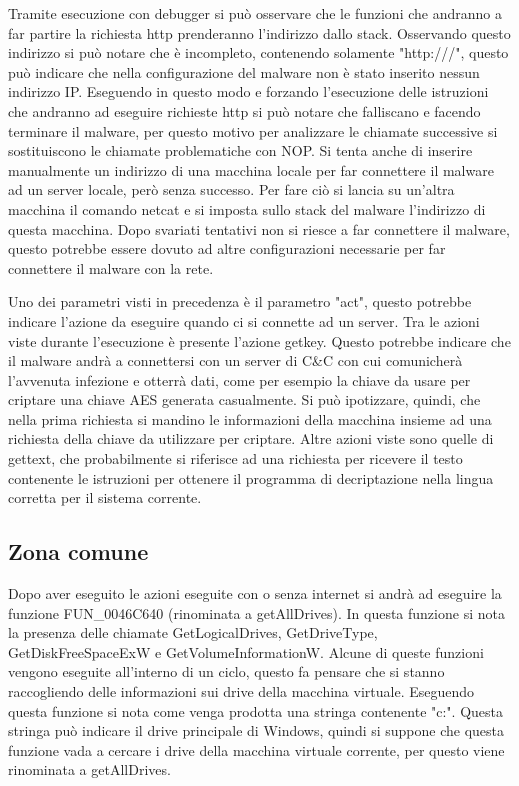 \documentclass[a4paper,12pt]{article}
\begin{document}
Tramite esecuzione con debugger si può osservare che le funzioni che andranno a far partire la richiesta http prenderanno l'indirizzo dallo stack. Osservando questo indirizzo si può notare che è incompleto, contenendo solamente "http:///", questo può indicare che nella configurazione del malware non è stato inserito nessun indirizzo IP. Eseguendo in questo modo e forzando l'esecuzione delle istruzioni che andranno ad eseguire richieste http si può notare che falliscano e facendo terminare il malware, per questo motivo per analizzare le chiamate successive si sostituiscono le chiamate problematiche con NOP. 
Si tenta anche di inserire manualmente un indirizzo di una macchina locale per far connettere il malware ad un server locale, però senza successo. Per fare ciò si lancia su un'altra macchina il comando netcat e si imposta sullo stack del malware l'indirizzo di questa macchina. Dopo svariati tentativi non si riesce a far connettere il malware, questo potrebbe essere dovuto ad altre configurazioni necessarie per far connettere il malware con la rete. 

Uno dei parametri visti in precedenza è il parametro "act", questo potrebbe indicare l'azione da eseguire quando ci si connette ad un server. Tra le azioni viste durante l'esecuzione è presente l'azione getkey. Questo potrebbe indicare che il malware andrà a connettersi con un server di C\&C con cui comunicherà l'avvenuta infezione e otterrà dati, come per esempio la chiave da usare per criptare una chiave AES generata casualmente. Si può ipotizzare, quindi, che nella prima richiesta si mandino le informazioni della macchina insieme ad una richiesta della chiave da utilizzare per criptare.
Altre azioni viste sono quelle di gettext, che probabilmente si riferisce ad una richiesta per ricevere il testo contenente le istruzioni per ottenere il programma di decriptazione nella lingua corretta per il sistema corrente. 

\subsection{Zona comune}
Dopo aver eseguito le azioni eseguite con o senza internet si andrà ad eseguire la funzione FUN\_0046C640 (rinominata a getAllDrives). In questa funzione si nota la presenza delle chiamate GetLogicalDrives, GetDriveType, GetDiskFreeSpaceExW e GetVolumeInformationW. Alcune di queste funzioni vengono eseguite all'interno di un ciclo, questo fa pensare che si stanno raccogliendo delle informazioni sui drive della macchina virtuale. Eseguendo questa funzione si nota come venga prodotta una stringa contenente "c:". Questa stringa può indicare il drive principale di Windows, quindi si suppone che questa funzione vada a cercare i drive della macchina virtuale corrente, per questo viene rinominata a getAllDrives.
\end{document}
